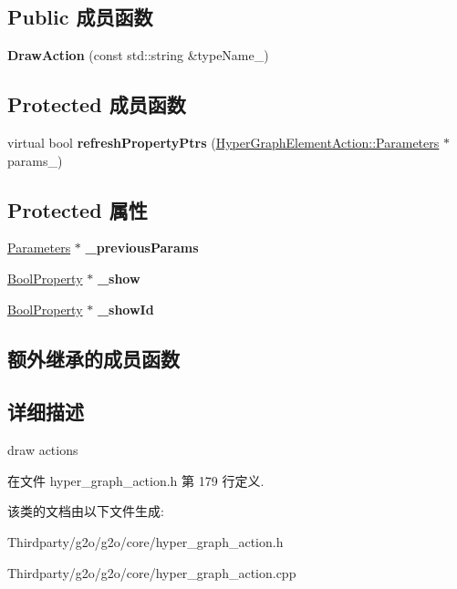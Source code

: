 \subsection*{Public 成员函数}
\begin{DoxyCompactItemize}
\item 
\hypertarget{classg2o_1_1DrawAction_a6b876d6a30fa564176dc6a3caefa572e}{{\bfseries Draw\-Action} (const std\-::string \&type\-Name\-\_\-)}\label{classg2o_1_1DrawAction_a6b876d6a30fa564176dc6a3caefa572e}

\end{DoxyCompactItemize}
\subsection*{Protected 成员函数}
\begin{DoxyCompactItemize}
\item 
\hypertarget{classg2o_1_1DrawAction_a9556cd6f8d1f842d45e046e1770699b0}{virtual bool {\bfseries refresh\-Property\-Ptrs} (\hyperlink{structg2o_1_1HyperGraphElementAction_1_1Parameters}{Hyper\-Graph\-Element\-Action\-::\-Parameters} $\ast$params\-\_\-)}\label{classg2o_1_1DrawAction_a9556cd6f8d1f842d45e046e1770699b0}

\end{DoxyCompactItemize}
\subsection*{Protected 属性}
\begin{DoxyCompactItemize}
\item 
\hypertarget{classg2o_1_1DrawAction_af598eb77ea4e27a1c0a27533c971639d}{\hyperlink{classg2o_1_1DrawAction_1_1Parameters}{Parameters} $\ast$ {\bfseries \-\_\-previous\-Params}}\label{classg2o_1_1DrawAction_af598eb77ea4e27a1c0a27533c971639d}

\item 
\hypertarget{classg2o_1_1DrawAction_a1ec3a46473daeb8ac65e6a523a9248b6}{\hyperlink{classg2o_1_1Property}{Bool\-Property} $\ast$ {\bfseries \-\_\-show}}\label{classg2o_1_1DrawAction_a1ec3a46473daeb8ac65e6a523a9248b6}

\item 
\hypertarget{classg2o_1_1DrawAction_ab5f870bf2a931e64bc994c87c4212ad3}{\hyperlink{classg2o_1_1Property}{Bool\-Property} $\ast$ {\bfseries \-\_\-show\-Id}}\label{classg2o_1_1DrawAction_ab5f870bf2a931e64bc994c87c4212ad3}

\end{DoxyCompactItemize}
\subsection*{额外继承的成员函数}


\subsection{详细描述}
draw actions 

在文件 hyper\-\_\-graph\-\_\-action.\-h 第 179 行定义.



该类的文档由以下文件生成\-:\begin{DoxyCompactItemize}
\item 
Thirdparty/g2o/g2o/core/hyper\-\_\-graph\-\_\-action.\-h\item 
Thirdparty/g2o/g2o/core/hyper\-\_\-graph\-\_\-action.\-cpp\end{DoxyCompactItemize}
